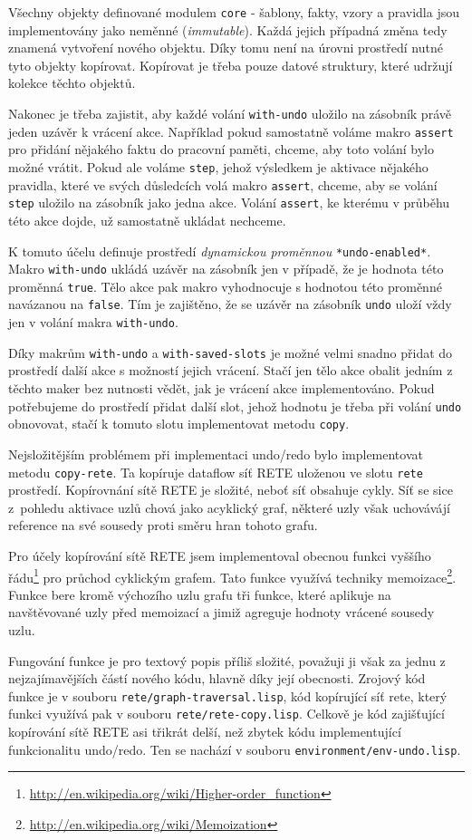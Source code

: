 Všechny objekty definované modulem \verb|core| - šablony, fakty, vzory a
pravidla jsou implementovány jako neměnné (\emph{immutable}). Každá jejich
případná změna tedy znamená vytvoření nového objektu. Díky tomu není na úrovni
prostředí nutné tyto objekty kopírovat. Kopírovat je třeba pouze datové
struktury, které udržují kolekce těchto objektů.

Nakonec je třeba zajistit, aby každé volání \verb|with-undo| uložilo na zásobník
právě jeden uzávěr k vrácení akce. Například pokud samostatně voláme makro
\verb|assert| pro přidání nějakého faktu do pracovní paměti, chceme, aby toto volání
bylo možné vrátit. Pokud ale voláme \verb|step|, jehož výsledkem je aktivace
nějakého pravidla, které ve svých důsledcích volá makro \verb|assert|, chceme,
aby se volání \verb|step| uložilo na zásobník jako jedna akce. Volání
\verb|assert|, ke kterému v průběhu této akce dojde, už samostatně ukládat
nechceme.

K tomuto účelu definuje prostředí \emph{dynamickou proměnnou}
\verb|*undo-enabled*|.  Makro \verb|with-undo| ukládá uzávěr na zásobník jen v
případě, že je hodnota této proměnná \verb|true|. Tělo akce pak makro
vyhodnocuje s hodnotou této proměnné navázanou na \verb|false|. Tím je
zajištěno, že se uzávěr na zásobník \verb|undo| uloží vždy jen v
 volání makra \verb|with-undo|.

Díky makrům \verb|with-undo| a \verb|with-saved-slots| je možné velmi snadno
přidat do prostředí další akce s možností jejich vrácení. Stačí jen tělo akce
obalit jedním z těchto maker bez nutnosti vědět, jak je vrácení akce
implementováno. Pokud potřebujeme do prostředí přidat další slot, jehož hodnotu
je třeba při volání \verb|undo| obnovovat, stačí k tomuto slotu implementovat
metodu \verb|copy|.

Nejsložitějším problémem při implementaci undo/redo bylo implementovat metodu
\verb|copy-rete|. Ta kopíruje dataflow síť RETE uloženou ve slotu \verb|rete|
prostředí. Kopírovnání sítě RETE je složité, neboť síť obsahuje cykly. Síť se
sice z~pohledu aktivace uzlů chová jako acyklický graf, některé uzly však
uchovávájí reference na své sousedy proti směru hran tohoto grafu.

Pro účely kopírování sítě RETE jsem implementoval obecnou funkci vyššího
řádu\footnote{\url{http://en.wikipedia.org/wiki/Higher-order_function}}
pro průchod cyklickým grafem. Tato funkce využívá techniky
memoizace\footnote{\url{http://en.wikipedia.org/wiki/Memoization}}. Funkce bere
kromě výchozího uzlu grafu tři funkce, které aplikuje na navštěvované uzly před
memoizací a jimiž agreguje hodnoty vrácené sousedy uzlu.

Fungování funkce je pro textový popis příliš složité, považuji ji však za jednu
z nejzajímavějších částí nového kódu, hlavně díky její obecnosti. Zrojový kód
funkce je v souboru \verb|rete/graph-traversal.lisp|, kód kopírující síť rete,
který funkci využívá pak v souboru \verb|rete/rete-copy.lisp|. Celkově je kód
zajišťující kopírování sítě RETE asi třikrát delší, než zbytek kódu
implementující funkcionalitu undo/redo. Ten se nachází v souboru
\verb|environment/env-undo.lisp|.

